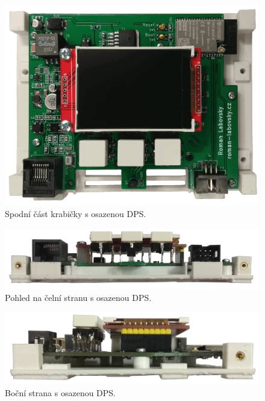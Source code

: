 \begin{figure}[H]
    \centering
    \includegraphics[width=\textwidth]{images/krabicka-nastenny-snimac-prostorove-teploty/krabicka-nastenny-snimac-prostorove-teploty-ethernet-spodni-cast-dps.png}
    \caption{Spodní část krabičky s osazenou DPS.}
    \label{fig:krabicka-nastenny-snimac-prostorove-teploty-ethernet-spodni-cast-dps}
\end{figure}

\begin{figure}[H]
    \centering
    \includegraphics[width=\textwidth]{images/krabicka-nastenny-snimac-prostorove-teploty/krabicka-nastenny-snimac-prostorove-teploty-ethernet-celni-strana-dps.png}
    \caption{Pohled na čelní stranu s osazenou DPS.}
    \label{fig:krabicka-nastenny-snimac-prostorove-teploty-ethernet-celni-strana-dps}
\end{figure}

\begin{figure}[H]
    \centering
    \includegraphics[width=\textwidth]{images/krabicka-nastenny-snimac-prostorove-teploty/krabicka-nastenny-snimac-prostorove-teploty-bocni-strana-dps.png}
    \caption{Boční strana s osazenou DPS.}
    \label{fig:krabicka-nastenny-snimac-prostorove-teploty-bocni-strana-dps}
\end{figure}